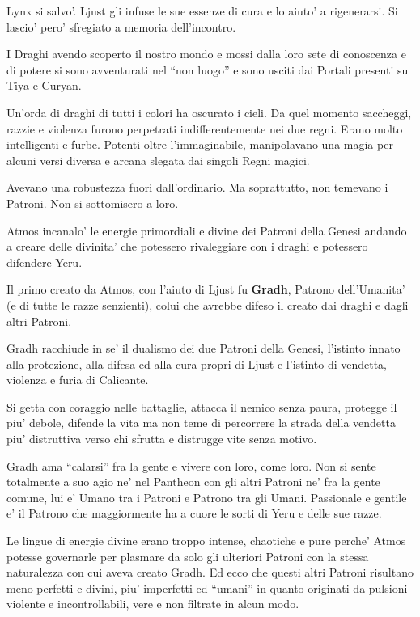 \documentclass[a4paper,11pt,twoside,openany]{dndbook}
\begin{document}
{Lynx si salvo'. Ljust gli infuse le sue essenze di cura e lo aiuto' a rigenerarsi. Si lascio' pero' sfregiato a memoria dell'incontro.

I Draghi avendo scoperto il nostro mondo e mossi dalla loro sete di conoscenza e di potere si sono avventurati nel ``non luogo'' e sono usciti dai Portali presenti su Tiya e Curyan.

Un'orda di draghi di tutti i colori ha oscurato i cieli. Da quel momento saccheggi, razzie e violenza furono perpetrati indifferentemente nei due regni. Erano molto intelligenti e furbe. Potenti oltre l'immaginabile, manipolavano una magia per alcuni versi diversa e arcana slegata dai singoli Regni magici.

Avevano una robustezza fuori dall'ordinario. Ma soprattutto, non temevano i Patroni. Non si sottomisero a loro.

Atmos incanalo' le energie primordiali e divine dei Patroni della Genesi andando a creare delle divinita' che potessero rivaleggiare con i draghi e potessero difendere Yeru.

Il primo creato da Atmos, con l'aiuto di Ljust fu \textbf{Gradh}, Patrono dell'Umanita' (e di tutte le razze senzienti), colui che avrebbe difeso il creato dai draghi e dagli altri Patroni.

Gradh racchiude in se' il dualismo dei due Patroni della Genesi, l'istinto innato alla protezione, alla difesa ed alla cura propri di Ljust e l'istinto di vendetta, violenza e furia di Calicante.

Si getta con coraggio nelle battaglie, attacca il nemico senza paura, protegge il piu' debole, difende la vita ma non teme di percorrere la strada della vendetta piu' distruttiva verso chi sfrutta e distrugge vite senza motivo.

Gradh ama ``calarsi'' fra la gente e vivere con loro, come loro. 
Non si sente totalmente a suo agio ne' nel Pantheon con gli altri Patroni ne' fra la gente comune, lui e' Umano tra i Patroni e Patrono tra gli Umani. Passionale e gentile e' il Patrono che maggiormente ha a cuore le sorti di Yeru e delle sue razze.

Le lingue di energie divine erano troppo intense, chaotiche e pure perche' Atmos potesse governarle per plasmare da solo gli ulteriori Patroni con la stessa naturalezza con cui aveva creato Gradh. Ed ecco che questi altri Patroni risultano meno perfetti e divini, piu' imperfetti ed ``umani'' in quanto originati da pulsioni violente e incontrollabili, vere e non filtrate in alcun modo.

}
\end{document}
